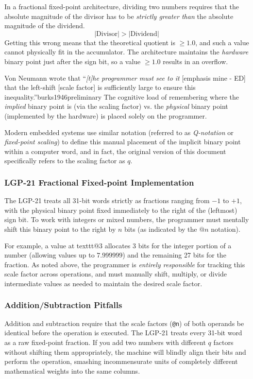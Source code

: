 \documentclass{article}
\begin{document}
In a fractional fixed-point architecture, dividing two numbers requires that the absolute magnitude of the divisor has to be \emph{strictly greater than} the absolute magnitude of the dividend.$$\left| \text{Divisor} \right| > \left| \text{Dividend} \right|$$Getting this wrong means that the theoretical quotient is $\ge 1.0$, and such a value cannot physically fit in the accumulator. The architecture maintains the \emph{hardware} binary point just after the sign bit, so a value $\ge 1.0$ results in an overflow.

Von Neumann wrote that ``\emph{[t]he programmer must see to it} [emphasis mine - ED] that the left-shift [scale factor] is sufficiently large to ensure this inequality.''burks1946preliminary\cite{burks1946preliminary} The cognitive load of remembering where the \emph{implied} binary point is (via the scaling factor) vs. the \emph{physical} binary point (implemented by the hardware) is placed solely on the programmer.

Modern embedded systems use similar notation (referred to as \emph{Q-notation} or \emph{fixed-point scaling}) to define this manual placement of the implicit binary point within a computer word, and in fact, the original version of this document specifically refers to the scaling factor as $q$.

\subsubsection*{LGP-21 Fractional Fixed-point Implementation}
\label{sec:fractional-fixed-point}
The LGP-21 treats all 31-bit words strictly as fractions ranging from $-1$ to $+1$, with the physical binary point fixed immediately to the right of the (leftmost) sign bit. To work with integers or mixed numbers, the programmer must mentally shift this binary point to the right by $n$ bits (as indicated by the $@n$ notation). 

For example, a value at texttt{@3} allocates 3 bits for the integer portion of a number (allowing values up to $7.999999$) and the remaining 27 bits for the fraction. As noted above, the programmer is \emph{entirely responsible} for tracking this scale factor across operations, and must manually shift, multiply, or divide intermediate values as needed to maintain the desired scale factor.

\subsubsection*{Addition/Subtraction Pitfalls}
Addition and subtraction require that the scale factors (\texttt{@n}) of both operands be identical before the operation is executed. The LGP-21 treats every 31-bit word as a raw fixed-point fraction. If you add two numbers with different $q$ factors without shifting them appropriately, the machine will blindly align their bits and perform the operation, smashing incommensurate units of completely different mathematical weights into the same columns. 
\end{document}
